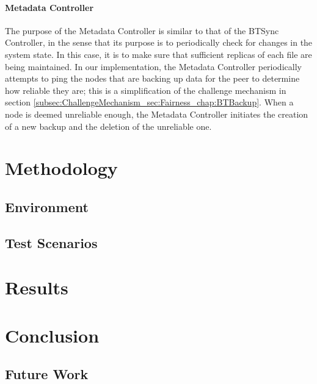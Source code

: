 \documentclass[12pt]{report}
\begin{document}
\subsubsection{Metadata Controller} \label{subsubsec:MetadataController_subsec:SystemCore_sec:SystemDesign_chap:Implementation}
The purpose of the Metadata Controller is similar to that of the BTSync Controller, in the sense that its purpose is to periodically check for changes in the system state. In this case, it is to make sure that sufficient replicas of each file are being maintained. In our implementation, the Metadata Controller periodically attempts to ping the nodes that are backing up data for the peer to determine how reliable they are; this is a simplification of the challenge mechanism in section \ref{subsec:ChallengeMechanism_sec:Fairness_chap:BTBackup}. When a node is deemed unreliable enough, the Metadata Controller initiates the creation of a new backup and the deletion of the unreliable one.

\chapter{Methodology}


\section{Environment}


\section{Test Scenarios}



\chapter{Results}

\chapter{Conclusion}

\section{Future Work}
\end{document}
